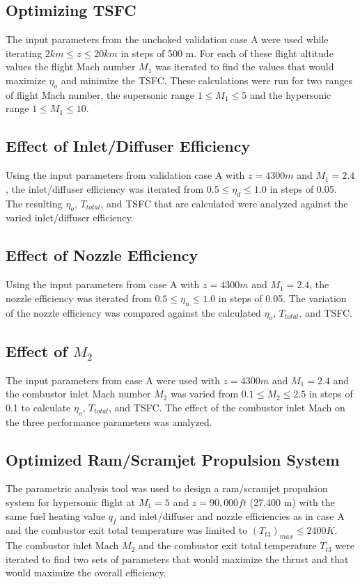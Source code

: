 \documentclass[conf]{new-aiaa} %
\begin{document}
\subsection{Optimizing TSFC} %
The input parameters from the unchoked validation case A were used while iterating $2 km \leq z \leq 20 km$ in steps of 500 m. For each of these flight altitude values the flight Mach number $M_1$ was iterated to find the values that would maximize $\eta_o$ and minimize the TSFC. These calculations were run for two ranges of flight Mach number, the supersonic range $1\leq M_1\leq 5$ and the hypersonic range $1\leq M_1\leq10$.

\subsection{Effect of Inlet/Diffuser Efficiency} %
Using the input parameters from validation case A with $z=4300m$ and $M_1=2.4$, the inlet/diffuser efficiency was iterated from $0.5\leq\eta_d\leq1.0$ in steps of 0.05. The resulting $\eta_o$, $T_{total}$, and TSFC that are calculated were analyzed against the varied inlet/diffuser efficiency.

\subsection{Effect of Nozzle Efficiency} %
Using the input parameters from case A with $z=4300m$ and $M_1=2.4$, the nozzle efficiency was iterated from $0.5\leq\eta_n\leq1.0$ in steps of 0.05. The variation of the nozzle efficiency was compared against the calculated $\eta_o$, $T_{total}$, and TSFC.

\subsection{Effect of \texorpdfstring{\textit{$M_2$}}{M2}} %
The input parameters from case A were used with $z=4300m$ and $M_1=2.4$ and the combustor inlet Mach number $M_2$ was varied from $0.1\leq M_2\leq2.5$ in steps of 0.1 to calculate $\eta_o$, $T_{total}$, and TSFC. The effect of the combustor inlet Mach on the three performance parameters was analyzed.

\subsection{Optimized Ram/Scramjet Propulsion System} %
The parametric analysis tool was used to design a ram/scramjet propulsion system for hypersonic flight at $M_1=5$ and $z=90,000ft$ (27,400 m) with the same fuel heating value $q_f$ and inlet/diffuser and nozzle efficiencies as in case A and the combustor exit total temperature was limited to $\left(T_{t3}\right)_{max}\leq2400K$. The combustor inlet Mach $M_2$ and the combustor exit total temperature $T_{t3}$ were iterated to find two sets of parameters that would maximize the thrust and that would maximize the overall efficiency.
\end{document}
